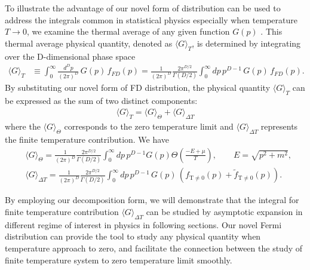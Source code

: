 \documentclass[sn-mathphys,Numbered]{sn-jnl}
\begin{document}
To illustrate the advantage of our novel form of distribution can be used to address the integrals common in statistical physics especially when temperature $T\to0$, we examine the thermal average of any given function $G(p)$ . This thermal average physical quantity, denoted as $\langle G\rangle_T$, is determined by integrating over the D-dimensional phase space 
\begin{align}
\langle G\rangle_T&\equiv\int^{\infty}_{0}\!\!\frac{d^Dp}{(2\pi)^D}\,G(p)\,f_{FD}(p)=\frac{1}{(2\pi)^D}\frac{2\pi^{D/2}}{\Gamma(D/2)}\int^{\infty}_{0}\!\!dp\,p^{D-1}\,G(p)\,f_{FD}(p).
\end{align}
By substituting our novel form of FD distribution, the physical quantity $\langle G\rangle_T$ can be expressed as the sum of two distinct components:
\begin{align}
\langle G\rangle_T=\langle G\rangle_{\Theta}+\langle G\rangle_{\Delta T}
\end{align}
 where the $\langle G\rangle_{\Theta}$ corresponds to the zero temperature limit and $\langle G\rangle_{\Delta T}$ represents the finite temperature contribution. We have
\begin{align}
&\langle G\rangle_{\Theta}=\frac{1}{(2\pi)^D}\frac{2\pi^{D/2}}{\Gamma(D/2)}\int^{\infty}_{0}\!\!dp\,p^{D-1}G(p)\Theta\left(\frac{-E+\mu}{T}\right),\qquad E=\sqrt{p^2+m^2},\\
&\langle G\rangle_{\Delta T}=\frac{1}{(2\pi)^D}\frac{2\pi^{D/2}}{\Gamma(D/2)}\int^{\infty}_{0}\!\!dp\,p^{D-1}\,G(p)\,\left(f_\mathrm{T\neq0}(p)+\widetilde f_\mathrm{T\neq0}(p)\right).\label{G_deltaT}
\end{align}

By employing our decomposition form, we will demonstrate that the integral for finite temperature contribution $\langle G\rangle_{\Delta T}$ can be studied by asymptotic expansion in different regime of interest in physics in following sections. Our novel Fermi distribution can provide the tool to study any physical quantity when temperature approach to zero, and facilitate the connection between the study of finite temperature system to zero temperature limit smoothly. 

\end{document}

